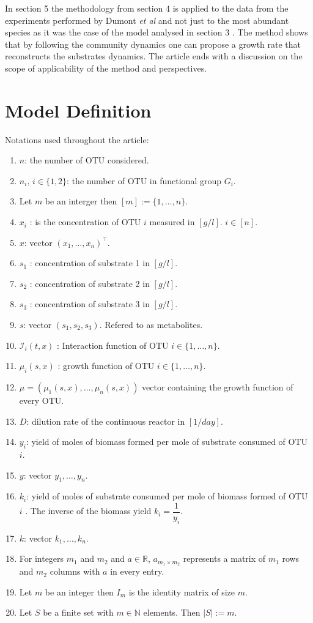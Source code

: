 \documentclass[3p,times]{article}
\newcommand{\N}{\mathbb{N}}
\newcommand{\R}{\mathbb{R}}
\newcommand{\I}{\mathcal{I}}
\begin{document}
In section 5 the methodology from section 4 is applied to the data from the experiments performed by Dumont \textit{et al}\cite{Dumont2009} and not just to the most abundant species as it was the case of the model analysed in section 3 \cite{Dumont2016}. The method shows that by following the community dynamics one can propose a growth rate that reconstructs the substrates dynamics. The article ends with a discussion on the scope of applicability of the method and perspectives. 

\section{Model Definition}

Notations used throughout the article:
\begin{enumerate}
	\item $n$: the number of OTU considered.
	\item $n_i, \, i \in \{1,2\}$: the number of OTU in functional group $G_i$.
	\item Let $m$ be an interger then $[m]:=\{1,\dots,n \}$. 
	\item $x_i$ :  is the concentration of OTU $i$ measured in $[g/l]$. $i \in [n]$. 
	\item $x$: vector $(x_1,\dots,x_n)^\top$.
	\item $s_1$ : concentration of substrate 1 in $[g/l]$.
	\item $s_2$ : concentration of substrate 2 in $[g/l]$. 
	\item $s_3$ : concentration of substrate 3 in $[g/l]$.
	\item $s$:  vector $(s_1,s_2,s_3)$. Refered to as metabolites.
	\item $\I_i(t,x)$ : Interaction function of OTU $i \in \{1,\dots,n\}$.
	\item $\mu_i(s,x)$ : growth function of OTU $i \in \{1,\dots,n\}$.
	\item $\mu = (\mu_1(s,x), \dots, \mu_n(s,x))$ vector containing the growth function of every OTU.
	\item $D$: dilution rate of the continuous reactor in $[1/day]$. 
	\item $y_i$: yield of moles of biomass formed per mole of substrate consumed of OTU $i$.
	\item $y$: vector $y_1,\dots,y_n$.
	\item $k_i$: yield of  moles of substrate consumed per mole of biomass formed of OTU $i$ . The inverse of the biomass yield $k_i = \dfrac{1}{y_i}$.
	\item $k$: vector $k_1,\dots,k_n$.
	\item For integers $m_1$ and $m_2$ and $a \in \R$, $a_{m_1 \times m_2}$ represents a matrix of $m_1$ rows and $m_2$ columns with $a$ in every entry. 
	\item Let $m$ be an integer then $I_m$ is the identity matrix of size $m$.
	\item Let $S$ be a finite set with $m \in \N$ elements. Then $\vert S \vert := m$. 
\end{enumerate}
\end{document}
